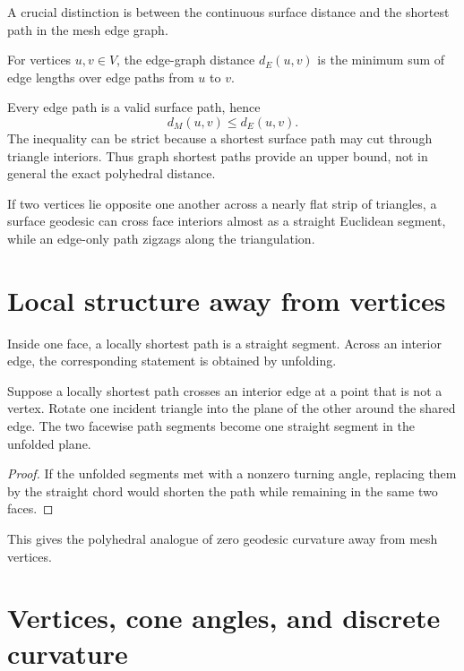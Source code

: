 A crucial distinction is between the continuous surface distance and the
shortest path in the mesh edge graph.

\begin{definition}\label{def:vii38-graphdist}
For vertices \(u,v\in V\), the edge-graph distance \(d_E(u,v)\) is the minimum
sum of edge lengths over edge paths from \(u\) to \(v\).
\end{definition}

Every edge path is a valid surface path, hence
\[
d_M(u,v)\le d_E(u,v).
\]
The inequality can be strict because a shortest surface path may cut through
triangle interiors.  Thus graph shortest paths provide an upper bound, not in
general the exact polyhedral distance.

\begin{example}\label{ex:vii38-diagonal}
If two vertices lie opposite one another across a nearly flat strip of triangles,
a surface geodesic can cross face interiors almost as a straight Euclidean
segment, while an edge-only path zigzags along the triangulation.
\end{example}

\section{Local structure away from vertices}

Inside one face, a locally shortest path is a straight segment.  Across an
interior edge, the corresponding statement is obtained by unfolding.

\begin{theorem}\label{thm:vii38-unfold}
Suppose a locally shortest path crosses an interior edge at a point that is not a
vertex.  Rotate one incident triangle into the plane of the other around the
shared edge.  The two facewise path segments become one straight segment in the
unfolded plane.
\end{theorem}

\begin{proof}
If the unfolded segments met with a nonzero turning angle, replacing them by the
straight chord would shorten the path while remaining in the same two faces.
\end{proof}

This gives the polyhedral analogue of zero geodesic curvature away from mesh
vertices.

\section{Vertices, cone angles, and discrete curvature}


